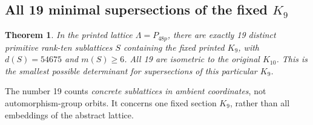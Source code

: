 \documentclass[11pt,a4paper]{article}
\newtheorem{theorem}{Theorem}[section]
\theoremstyle{remark}\newtheorem{remark}[theorem]{Remark}
\begin{document}
\subsection{All 19 minimal supersections of the fixed \texorpdfstring{$K_9$}{K9}}

\begin{theorem}\label{thm:nineteen}
In the printed lattice $\Lambda=P_{48p}$, there are exactly 19 distinct primitive rank-ten sublattices $S$ containing the fixed printed $K_9$, with $d(S)=54675$ and $m(S)\ge6$. All 19 are isometric to the original $K_{10}$. This is the smallest possible determinant for supersections of this particular $K_9$.
\end{theorem}

The number 19 counts \emph{concrete sublattices in ambient coordinates}, not automorphism-group orbits. It concerns one fixed section $K_9$, rather than all embeddings of the abstract lattice.
\end{document}
